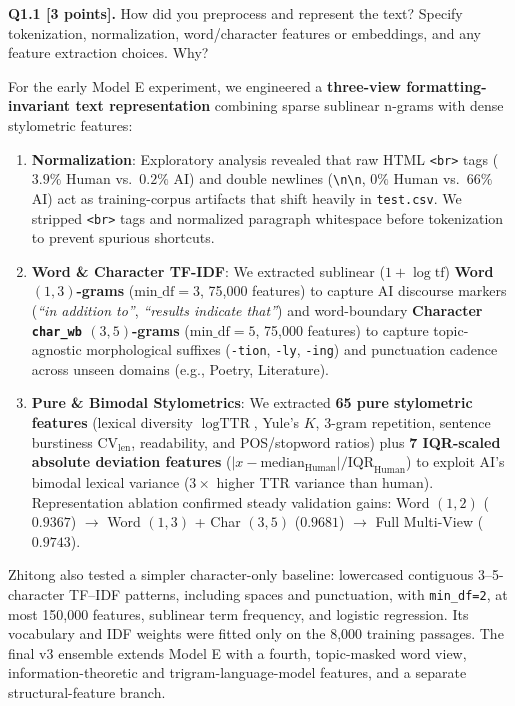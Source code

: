 \documentclass[11pt,letterpaper]{article}
\begin{document}
\vspace{6pt}
\textbf{Q1.1 [3 points].} How did you preprocess and represent the text? Specify tokenization, normalization, word/character features or embeddings, and any feature extraction choices. Why?

For the early Model E experiment, we engineered a \textbf{three-view formatting-invariant text representation} combining sparse sublinear n-grams with dense stylometric features:
\begin{enumerate}[leftmargin=*,itemsep=1pt,topsep=2pt]
    \item \textbf{Normalization}: Exploratory analysis revealed that raw HTML \texttt{<br>} tags ($3.9\%$ Human vs.\ $0.2\%$ AI) and double newlines (\texttt{\textbackslash n\textbackslash n}, $0\%$ Human vs.\ $66\%$ AI) act as training-corpus artifacts that shift heavily in \texttt{test.csv}. We stripped \texttt{<br>} tags and normalized paragraph whitespace before tokenization to prevent spurious shortcuts.
    \item \textbf{Word \& Character TF-IDF}: We extracted sublinear ($1+\log\text{tf}$) \textbf{Word $(1,3)$-grams} ($\text{min\_df}=3$, 75,000 features) to capture AI discourse markers (\textit{``in addition to''}, \textit{``results indicate that''}) and word-boundary \textbf{Character \texttt{char\_wb} $(3,5)$-grams} ($\text{min\_df}=5$, 75,000 features) to capture topic-agnostic morphological suffixes (\texttt{-tion}, \texttt{-ly}, \texttt{-ing}) and punctuation cadence across unseen domains (e.g., Poetry, Literature).
    \item \textbf{Pure \& Bimodal Stylometrics}: We extracted \textbf{65 pure stylometric features} (lexical diversity $\log\text{TTR}$, Yule's $K$, 3-gram repetition, sentence burstiness $\text{CV}_{\text{len}}$, readability, and POS/stopword ratios) plus \textbf{7 IQR-scaled absolute deviation features} ($|x - \text{median}_{\text{Human}}| / \text{IQR}_{\text{Human}}$) to exploit AI's bimodal lexical variance ($3\times$ higher TTR variance than human). Representation ablation confirmed steady validation gains: Word $(1,2)$ ($0.9367$) $\to$ Word $(1,3)$ + Char $(3,5)$ ($0.9681$) $\to$ Full Multi-View ($0.9743$).
\end{enumerate}

Zhitong also tested a simpler character-only baseline: lowercased contiguous 3--5-character TF--IDF patterns, including spaces and punctuation, with \texttt{min\_df=2}, at most 150,000 features, sublinear term frequency, and logistic regression. Its vocabulary and IDF weights were fitted only on the 8,000 training passages. The final v3 ensemble extends Model E with a fourth, topic-masked word view, information-theoretic and trigram-language-model features, and a separate structural-feature branch.
\end{document}
